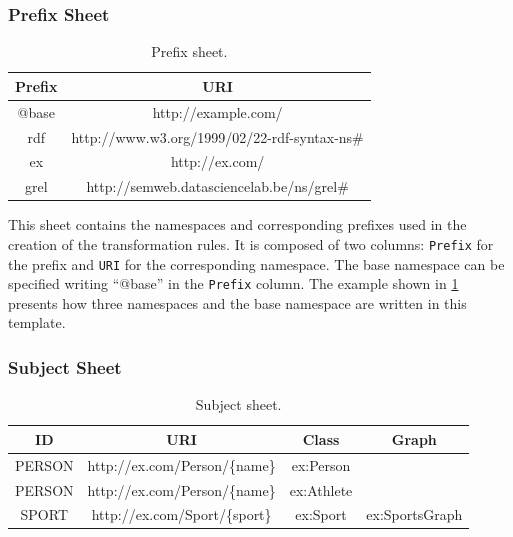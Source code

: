 \subsubsection{Prefix Sheet} 

\begin{table}[h!]
\caption{Prefix sheet.}
\label{tab:chp5-1_prefix_sheet}
\centering
\begin{tabular}{c|c}
\midrule
\textbf{Prefix} & \textbf{URI}                                 \\ \midrule
@base           & http://example.com/                          \\
rdf             & http://www.w3.org/1999/02/22-rdf-syntax-ns\# \\
ex              & http://ex.com/                               \\ 
grel            & http://semweb.datasciencelab.be/ns/grel\#     \\
\midrule
\end{tabular}
\end{table}

This sheet contains the namespaces and corresponding prefixes used in the creation of the transformation rules. 
It is composed of two columns: \texttt{Prefix} for the prefix and \texttt{URI} for the corresponding namespace. The base namespace can be specified writing ``@base'' in the \texttt{Prefix} column. 
The example shown in \cref{tab:chp5-1_prefix_sheet} presents how three namespaces and the base namespace are written in this template. 


\subsubsection{Subject Sheet} 

\begin{table}[!h]
\caption{Subject sheet.}
\label{tab:chp5-1_subject_sheet}
\centering
\begin{tabular}{c|c|c|c}
\midrule
\textbf{ID} & \textbf{URI} & \textbf{Class} & \textbf{Graph} \\ \midrule
PERSON & http://ex.com/Person/\{name\} & ex:Person &  \\
PERSON & http://ex.com/Person/\{name\} & ex:Athlete &  \\
SPORT & http://ex.com/Sport/\{sport\} & ex:Sport & ex:SportsGraph \\ \midrule
\end{tabular}
\end{table}


